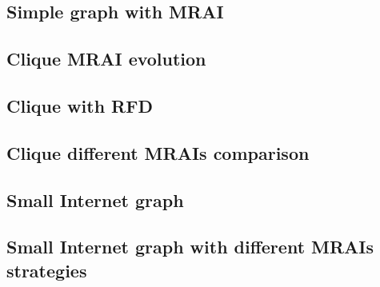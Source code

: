 \documentclass[10pt,journal,onecolumn]{IEEEtran}
\begin{document}
\subsection{Simple graph with MRAI}
\label{subsec:simple_graph_with_MRAI}

\subsection{Clique MRAI evolution}
\label{subsec:clique_evolution}

\subsection{Clique with RFD}
\label{subsec:clique_rfd}

\subsection{Clique different MRAIs comparison}
\label{subsec:clique_different_mrais}

\subsection{Small Internet graph}
\label{subsec:small_internet_graph}

\subsection{Small Internet graph with different MRAIs strategies}
\label{subsec:small_internet_graph_multiple_MRAIs}

\printindex


\end{document}
